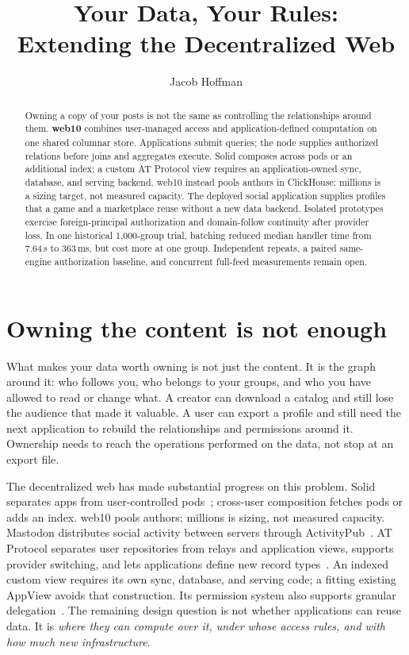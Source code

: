 \documentclass[sigconf, nonacm]{acmart}
\title{Your Data, Your Rules: \\ Extending the Decentralized Web}
\author{Jacob Hoffman}
\affiliation{\institution{web10 Inc.}\country{}}
\begin{document}
\begin{abstract}
Owning a copy of your posts is not the same as controlling the
relationships around them. \textbf{web10} combines user-managed access
and application-defined computation on one shared columnar store.
Applications submit queries; the node supplies authorized relations
before joins and aggregates execute. Solid composes across pods or an
additional index; a custom AT Protocol view requires an application-owned
sync, database, and serving backend. web10 instead pools authors in
ClickHouse: millions is a sizing target, not measured capacity.
The deployed social application supplies profiles that a game and a
marketplace reuse without a new data backend. Isolated prototypes exercise
foreign-principal authorization and domain-follow continuity after provider
loss. In one historical 1,000-group trial, batching reduced median handler
time from 7.64\,s to 363\,ms, but cost more at one group. Independent repeats,
a paired same-engine authorization baseline, and concurrent full-feed
measurements remain open.
\end{abstract}
\maketitle

\section{Owning the content is not enough}
\label{sec:intro}

What makes your data worth owning is not just the content. It is the
graph around it: who follows you, who belongs to your groups, and who
you have allowed to read or change what. A creator can download a
catalog and still lose the audience that made it valuable. A user can
export a profile and still need the next application to rebuild the
relationships and permissions around it. Ownership needs to reach the
operations performed on the data, not stop at an export file.

The decentralized web has made substantial progress on this problem.
Solid separates apps from user-controlled pods~\cite{solid2016,solid-protocol2024};
cross-user composition fetches pods or adds an index. web10 pools authors;
millions is sizing, not measured capacity.
Mastodon distributes social activity between servers through
ActivityPub~\cite{activitypub2018}. AT Protocol separates user repositories
from relays and application views, supports provider switching, and lets
applications define new record types~\cite{kleppmann2024,at-statusphere}.
An indexed custom view requires its own sync, database, and serving code;
a fitting existing AppView avoids that construction.
Its permission system also supports granular delegation~\cite{at-permissions}.
The remaining design question is not whether applications can reuse
data. It is \emph{where they can compute over it, under whose access
rules, and with how much new infrastructure}.
\end{document}
